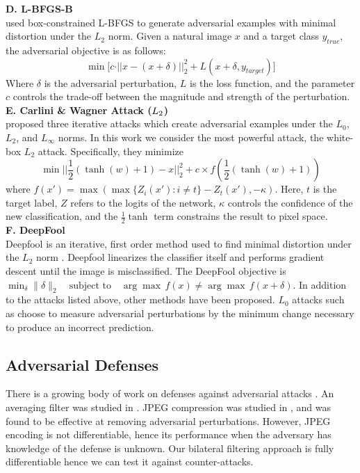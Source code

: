 \documentclass{article} %
\begin{document}
\noindent \textbf{D. L-BFGS-B}\\
\citep{szegedy2014intriguing} used box-constrained L-BFGS to generate adversarial examples with minimal distortion under the $L_2$ norm. Given a natural image $x$ and a target class $y_{true}$, the adversarial objective is as follows: 
\[ \min \Big[ c \cdot \vert \vert x - (x + \delta) \vert \vert^{2}_{2} + L(x+\delta, y_{target}) \Big] \]
Where $\delta$ is the adversarial perturbation, $L$ is the loss function, and the parameter $c$ controls the trade-off between the magnitude and strength of the perturbation. 
\\

\noindent \textbf{E. Carlini \& Wagner Attack ($\normalfont{L_2}$)} \\
\citep{carlini2017towards} proposed three iterative attacks which create adversarial examples under the $L_0$, $L_2$, and $L_\infty$ norms. In this work we consider the most powerful attack, the white-box $L_2$ attack. Specifically, they minimize
\[\min \vert \vert \frac{1}{2}(\tanh(w) + 1)- x \vert \vert^{2}_{2} + c \times f (\frac{1}{2}(\tanh(w)+1))\] 
where $f(x') = \max(\max\{Z_i(x') : i \neq t\}- Z_t(x'), -\kappa)$.
Here, $t$ is the target label, $Z$ refers to the logits of the network, $\kappa$ controls the confidence of the new classification, and the $\frac{1}{2}\tanh$ term constrains the result to pixel space.
\\

\noindent \textbf{F. DeepFool}\\
Deepfool is an iterative, first order method used to find minimal distortion under the $L_2$ norm \citep{moosavi2016deepfool}. Deepfool linearizes the classifier itself and performs gradient descent until the image is misclassified. The DeepFool objective is  $ \min_{\delta} \|\delta\|_2 \quad \textrm{subject to}\quad \arg\max \, f(x) \neq \arg\max \, f(x + \delta)$.
In addition to the attacks listed above, other methods have been proposed. $L_0$ attacks such as \citep{papernot2016limitations} choose to measure adversarial perturbations by the minimum change necessary to produce an incorrect prediction.
\\

\subsection{Adversarial Defenses}
There is a growing body of work on defenses against adversarial attacks \citep{papernot2016effectiveness,papernot2015distillation,xu2017feature,liao2018defense}. An averaging filter was studied in \citep{li2017adversarial}. JPEG compression was studied in \citep{dziugaite2016study,das2017keeping}, and was found to be effective at removing adversarial perturbations. However, JPEG encoding is not differentiable, hence its performance when the adversary has knowledge of the defense is unknown. Our bilateral filtering approach is fully differentiable hence we can test it against counter-attacks.
\end{document}
